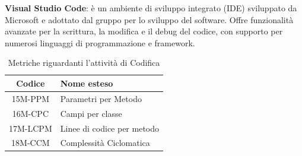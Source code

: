 \textbf{Visual Studio Code}: è un ambiente di sviluppo integrato (IDE) sviluppato da Microsoft e adottato dal gruppo per lo sviluppo del software. Offre funzionalità avanzate per la scrittura, la modifica e il debug del codice, con supporto per numerosi linguaggi di programmazione e framework.
\begin{table}[!h]
	\centering
	\begin{tabular}{|c|l|}
		\hline
		\textbf{Codice} & \textbf{Nome esteso}      \\
		\hline
		15M-PPM 	& Parametri per Metodo 			\\
		16M-CPC 	& Campi per classe 				\\
		17M-LCPM 	& Linee di codice per metodo 	\\
		18M-CCM 	& Complessità Ciclomatica 		\\
		\hline
	\end{tabular}
	\caption{Metriche riguardanti l'attività di Codifica}
\end{table}

\newpage
